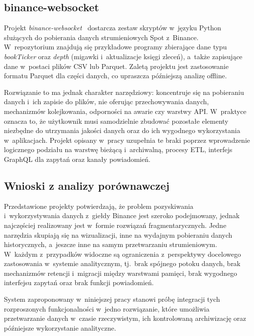 \subsection{binance-websocket}
\label{subsec:binance-websocket}

Projekt \textit{binance-websocket}~\cite{github_binance_websocket_scripts} dostarcza zestaw skryptów w~języku Python
służących do pobierania danych strumieniowych Spot z~Binance.
W~repozytorium znajdują się przykładowe programy zbierające dane typu \textit{bookTicker} oraz \textit{depth} (migawki i~aktualizacje
księgi zleceń), a~także zapisujące dane w~postaci plików CSV lub Parquet.
Zaletą projektu jest zastosowanie formatu Parquet dla części danych, co upraszcza późniejszą analizę offline.

Rozwiązanie to ma jednak charakter narzędziowy: koncentruje się na pobieraniu danych i~ich zapisie do plików,
nie oferując przechowywania danych, mechanizmów kolejkowania, odporności na awarie czy warstwy API\@.
W~praktyce oznacza to, że użytkownik musi samodzielnie zbudować pozostałe elementy niezbędne do utrzymania jakości danych
oraz do ich wygodnego wykorzystania w~aplikacjach.
Projekt opisany w~pracy uzupełnia te braki poprzez wprowadzenie logicznego podziału na warstwę bieżącą i~archiwalną,
procesy ETL, interfejs GraphQL dla zapytań oraz kanały powiadomień.

\subsection{Wnioski z analizy porównawczej}
\label{subsec:wnioski-z-analizy-porownawczej}

Przedstawione projekty potwierdzają, że problem pozyskiwania i~wykorzystywania danych z~giełdy Binance jest szeroko
podejmowany, jednak najczęściej realizowany jest w~formie rozwiązań fragmentarycznych.
Jedne narzędzia skupiają się na wizualizacji, inne na wydajnym pobieraniu danych historycznych, a~jeszcze inne na samym
przetwarzaniu strumieniowym.
W~każdym z~przypadków widoczne są ograniczenia z~perspektywy docelowego zastosowania w~systemie analitycznym, tj.\ brak
spójnego potoku danych, brak mechanizmów retencji i~migracji między warstwami pamięci, brak wygodnego interfejsu zapytań
oraz brak funkcji powiadomień.

System zaproponowany w~niniejszej pracy stanowi próbę integracji tych rozproszonych funkcjonalności w~jedno rozwiązanie,
które umożliwia przetwarzanie danych w~czasie rzeczywistym, ich kontrolowaną archiwizację oraz późniejsze wykorzystanie
analityczne.
